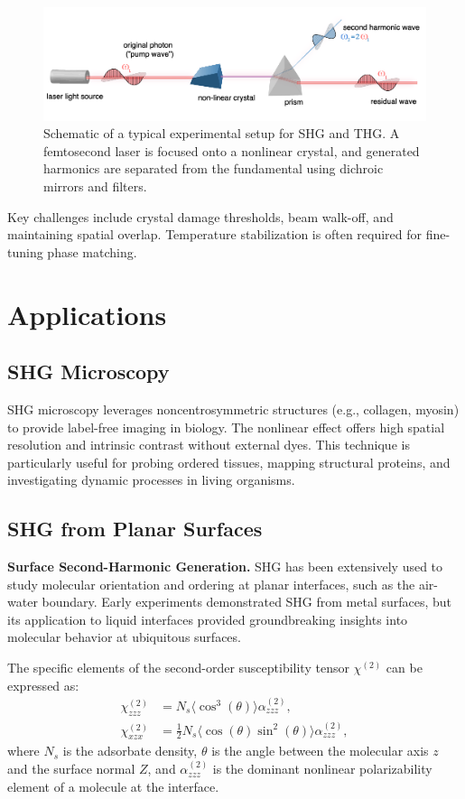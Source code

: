 \documentclass[9pt,a4paper,twocolumn,twoside]{tau-class/tau}
\begin{document}
\begin{figure}[h!]
\centering
\includegraphics[width=0.95\columnwidth]{figures/experimental.png}
\caption{Schematic of a typical experimental setup for SHG and THG. A femtosecond laser is focused onto a nonlinear crystal, and generated harmonics are separated from the fundamental using dichroic mirrors and filters. \cite{JkwchuiImage}}
\end{figure}

Key challenges include crystal damage thresholds, beam walk-off, and maintaining spatial overlap. Temperature stabilization is often required for fine-tuning phase matching.

\section{Applications}
\subsection{SHG Microscopy}
SHG microscopy leverages noncentrosymmetric structures (e.g., collagen, myosin) to provide label-free imaging in biology. The nonlinear effect offers high spatial resolution and intrinsic contrast without external dyes. This technique is particularly useful for probing ordered tissues, mapping structural proteins, and investigating dynamic processes in living organisms.

\subsection{SHG from Planar Surfaces}
\textbf{Surface Second-Harmonic Generation.} SHG has been extensively used to study molecular orientation and ordering at planar interfaces, such as the air-water boundary. Early experiments demonstrated SHG from metal surfaces, but its application to liquid interfaces provided groundbreaking insights into molecular behavior at ubiquitous surfaces.

The specific elements of the second-order susceptibility tensor $\chi^{(2)}$ can be expressed as:
\begin{align}
\chi_{zzz}^{(2)} &= N_s \langle \cos^3(\theta) \rangle \alpha_{zzz}^{(2)}, \\
\chi_{xzx}^{(2)} &= \frac{1}{2} N_s \langle \cos(\theta) \sin^2(\theta) \rangle \alpha_{zzz}^{(2)},
\end{align}
where $N_s$ is the adsorbate density, $\theta$ is the angle between the molecular axis $z$ and the surface normal $Z$, and $\alpha_{zzz}^{(2)}$ is the dominant nonlinear polarizability element of a molecule at the interface. \cite{SecondHarmonicGeneration}
\end{document}
